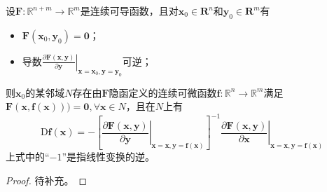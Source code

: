 \documentclass[../main.tex]{subfiles}
\begin{document}
\begin{theorem}[隐函数定理]\label{thm:II.4.13}
    设$\mathbf{F}:\mathbb{R}^{n+m}\rightarrow\mathbb{R}^m$是连续可导函数，且对$\mathbf{x}_0\in\mathbf{R}^n$和$\mathbf{y}_0\in\mathbf{R}^m$有
    \begin{itemize}
        \item $\mathbf{F}\left(\mathbf{x}_0,\mathbf{y}_0\right)=\mathbf{0}$；
        \item 导数$\left.\frac{\partial \mathbf{F}\left(\mathbf{x},\mathbf{y}\right)}{\partial \mathbf{y}}\right|_{\mathbf{x}=\mathbf{x}_0,\mathbf{y}=\mathbf{y}_0}$可逆；
    \end{itemize}
    则$\mathbf{x}_0$的某邻域$N$存在由$\mathbf{F}$隐函定义的连续可微函数$\mathbf{f}:\mathbb{R}^n\rightarrow\mathbb{R}^m$满足$\mathbf{F}\left(\mathbf{x},\mathbf{f}\left(\mathbf{x}\right)\right))=\mathbf{0},\forall\mathbf{x}\in N$，且在$N$上有
    \[\mathrm{D}\mathbf{f}\left(\mathbf{x}\right)=-\left[\left.\frac{\partial\mathbf{F}\left(\mathbf{x},\mathbf{y}\right)}{\partial\mathbf{y}}\right|_{\mathbf{x}=\mathbf{x},\mathbf{y}=\mathbf{f}\left(\mathbf{x}\right)}\right]^{-1}\left.\frac{\partial\mathbf{F}\left(\mathbf{x},\mathbf{y}\right)}{\partial\mathbf{x}}\right|_{\mathbf{x}=\mathbf{x},\mathbf{y}=\mathbf{f}\left(\mathbf{x}\right)}\]
    上式中的“$-1$”是指线性变换的逆。
\end{theorem}
\begin{proof}
    待补充\cite[p.~593]{Williamson1972}。
\end{proof}
\end{document}
